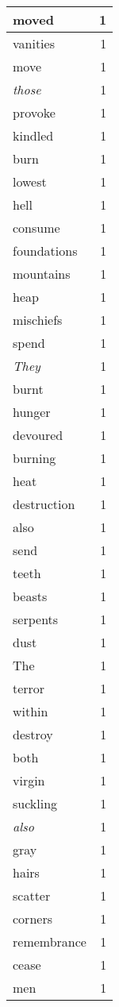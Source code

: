 \begin{center}
\begin{longtable}{l|r}
moved & 1 \\ \hline
vanities & 1 \\ \hline
move & 1 \\ \hline
\emph{those} & 1 \\ \hline
provoke & 1 \\ \hline
kindled & 1 \\ \hline
burn & 1 \\ \hline
lowest & 1 \\ \hline
hell & 1 \\ \hline
consume & 1 \\ \hline
foundations & 1 \\ \hline
mountains & 1 \\ \hline
heap & 1 \\ \hline
mischiefs & 1 \\ \hline
spend & 1 \\ \hline
\emph{They} & 1 \\ \hline
burnt & 1 \\ \hline
hunger & 1 \\ \hline
devoured & 1 \\ \hline
burning & 1 \\ \hline
heat & 1 \\ \hline
destruction & 1 \\ \hline
also & 1 \\ \hline
send & 1 \\ \hline
teeth & 1 \\ \hline
beasts & 1 \\ \hline
serpents & 1 \\ \hline
dust & 1 \\ \hline
The & 1 \\ \hline
terror & 1 \\ \hline
within & 1 \\ \hline
destroy & 1 \\ \hline
both & 1 \\ \hline
virgin & 1 \\ \hline
suckling & 1 \\ \hline
\emph{also} & 1 \\ \hline
gray & 1 \\ \hline
hairs & 1 \\ \hline
scatter & 1 \\ \hline
corners & 1 \\ \hline
remembrance & 1 \\ \hline
cease & 1 \\ \hline
men & 1 \\ \hline

\end{longtable}
\end{center}
